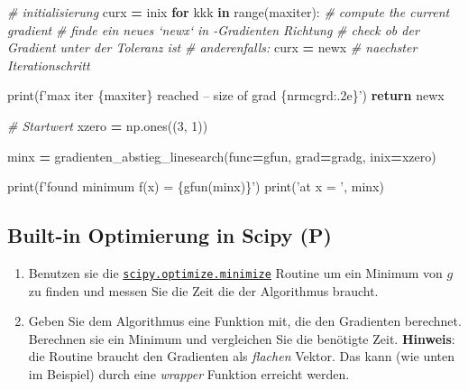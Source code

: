 \documentclass[]{book}
\newenvironment{Shaded}{\begin{snugshade}}{\end{snugshade}}
\newcommand{\BuiltInTok}[1]{#1}
\newcommand{\CommentTok}[1]{\textcolor[rgb]{0.56,0.35,0.01}{\textit{#1}}}
\newcommand{\ControlFlowTok}[1]{\textcolor[rgb]{0.13,0.29,0.53}{\textbf{#1}}}
\newcommand{\DecValTok}[1]{\textcolor[rgb]{0.00,0.00,0.81}{#1}}
\newcommand{\KeywordTok}[1]{\textcolor[rgb]{0.13,0.29,0.53}{\textbf{#1}}}
\newcommand{\NormalTok}[1]{#1}
\newcommand{\OperatorTok}[1]{\textcolor[rgb]{0.81,0.36,0.00}{\textbf{#1}}}
\newcommand{\SpecialCharTok}[1]{\textcolor[rgb]{0.00,0.00,0.00}{#1}}
\newcommand{\SpecialStringTok}[1]{\textcolor[rgb]{0.31,0.60,0.02}{#1}}
\newcommand{\StringTok}[1]{\textcolor[rgb]{0.31,0.60,0.02}{#1}}
\theoremstyle{definition}
\theoremstyle{definition}
\theoremstyle{definition}
\theoremstyle{definition}
\theoremstyle{remark}
\begin{document}
\begin{Shaded}
\begin{Highlighting}[]
    \CommentTok{# initialisierung}
\NormalTok{    curx }\OperatorTok{=}\NormalTok{ inix}
    \ControlFlowTok{for}\NormalTok{ kkk }\KeywordTok{in} \BuiltInTok{range}\NormalTok{(maxiter):}
        \CommentTok{# compute the current gradient}
        \CommentTok{# finde ein neues `newx` in -Gradienten Richtung}
        \CommentTok{# check ob der Gradient unter der Toleranz ist}
        \CommentTok{# anderenfalls:}
\NormalTok{        curx }\OperatorTok{=}\NormalTok{ newx  }\CommentTok{# naechster Iterationschritt}

    \BuiltInTok{print}\NormalTok{(}\SpecialStringTok{f'max iter }\SpecialCharTok{\{}\NormalTok{maxiter}\SpecialCharTok{\}}\SpecialStringTok{ reached -- size of grad }\SpecialCharTok{\{}\NormalTok{nrmcgrd}\SpecialCharTok{:.2e\}}\SpecialStringTok{'}\NormalTok{)}
    \ControlFlowTok{return}\NormalTok{ newx}

\CommentTok{# Startwert}
\NormalTok{xzero }\OperatorTok{=}\NormalTok{ np.ones((}\DecValTok{3}\NormalTok{, }\DecValTok{1}\NormalTok{))}

\NormalTok{minx }\OperatorTok{=}\NormalTok{ gradienten_abstieg_linesearch(func}\OperatorTok{=}\NormalTok{gfun, grad}\OperatorTok{=}\NormalTok{gradg, inix}\OperatorTok{=}\NormalTok{xzero)}

\BuiltInTok{print}\NormalTok{(}\SpecialStringTok{f'found minimum f(x) = }\SpecialCharTok{\{}\NormalTok{gfun(minx)}\SpecialCharTok{\}}\SpecialStringTok{'}\NormalTok{)}
\BuiltInTok{print}\NormalTok{(}\StringTok{'at x = '}\NormalTok{, minx)}
\end{Highlighting}
\end{Shaded}

\hypertarget{built-in-optimierung-in-scipy-p}{%
\subsection{Built-in Optimierung in Scipy (P)}\label{built-in-optimierung-in-scipy-p}}

\begin{enumerate}
\def\labelenumi{\arabic{enumi}.}
\item
  Benutzen sie die \href{https://docs.scipy.org/doc/scipy/reference/generated/scipy.optimize.minimize.html\#scipy.optimize.minimize}{\texttt{scipy.optimize.minimize}} Routine um ein Minimum von \(g\) zu finden und messen Sie die Zeit die der Algorithmus braucht.
\item
  Geben Sie dem Algorithmus eine Funktion mit, die den Gradienten berechnet. Berechnen sie ein Minimum und vergleichen Sie die benötigte Zeit. \textbf{Hinweis}: die Routine braucht den Gradienten als \emph{flachen} Vektor. Das kann (wie unten im Beispiel) durch eine \emph{wrapper} Funktion erreicht werden.
\end{enumerate}
\end{document}
